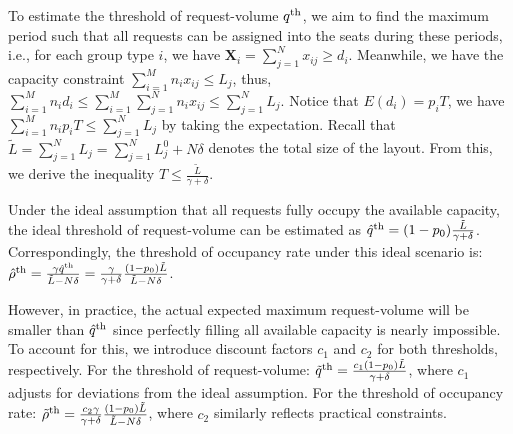 
To estimate the threshold of request-volume $q^{\textup{th}}$, we aim to find the maximum period such that all requests can be assigned into the seats during these periods, i.e., for each group type $i$, we have $\bm{X}_{i} = \sum_{j =1}^{N} x_{ij} \geq d_i$. Meanwhile, we have the capacity constraint $\sum_{i =1}^{M} n_{i} x_{ij} \leq L_j$, thus, $\sum_{i =1}^{M} n_i d_i \leq \sum_{i =1}^{M} \sum_{j =1}^{N} n_i x_{ij} \leq \sum_{j =1}^{N} L_{j}$. Notice that $E(d_i) = p_i T$, we have $\sum_{i =1}^{M} n_i p_i T \leq \sum_{j =1}^{N} L_{j}$ by taking the expectation. Recall that $\tilde{L} = \sum_{j =1}^{N} L_{j} = \sum_{j =1}^{N} L_{j}^{0} + N \delta$ denotes the total size of the layout. From this, we derive the inequality $T \leq \frac{\tilde{L}}{\gamma + \delta}$. 


Under the ideal assumption that all requests fully occupy the available capacity, the ideal threshold of request-volume can be estimated as $\hat{q}^{\textup{th}} = (1-p_0) \frac{\tilde{L}}{\gamma + \delta}$. Correspondingly, the threshold of occupancy rate under this ideal scenario is: 
$\hat{\rho}^{\textup{th}}= \frac{\gamma \hat{q}^{\textup{th}}}{\tilde{L} - N \delta} = \frac{\gamma}{\gamma +\delta} \frac{(1-p_0) \tilde{L}}{\tilde{L}- N \delta}$.

However, in practice, the actual expected maximum request-volume will be smaller than $\hat{q}^{\textup{th}}$ since perfectly filling all available capacity is nearly impossible. To account for this, we introduce discount factors $c_1$ and $c_2$ for both thresholds, respectively. For the threshold of request-volume:
$\tilde{q}^{\textup{th}} =  \frac{c_1 (1-p_0) \tilde{L}}{\gamma + \delta}$, where $c_1$ adjusts for deviations from the ideal assumption.
For the threshold of occupancy rate:
$\tilde{\rho}^{\textup{th}} = \frac{c_2 \gamma}{\gamma +\delta} \frac{(1-p_0) \tilde{L}}{\tilde{L}-N \delta}$, where $c_2$ similarly reflects practical constraints.



